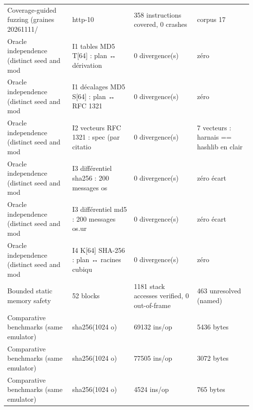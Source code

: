 \begin{table}[htbp]
\begin{tabularx}{\textwidth}{@{}l l X l@{}}
Coverage-guided fuzzing (graines 20261111/ & http-10 & 358 instructions covered, 0 crashes & corpus 17 \\
Oracle independence (distinct seed and mod & I1 tables MD5 T[64] : plan ↔ dérivation  & 0 divergence(s) & zéro \\
Oracle independence (distinct seed and mod & I1 décalages MD5 S[64] : plan ↔ RFC 1321 & 0 divergence(s) & zéro \\
Oracle independence (distinct seed and mod & I2 vecteurs RFC 1321 : spec (par citatio & 0 divergence(s) & 7 vecteurs : harnais == hashlib en clair \\
Oracle independence (distinct seed and mod & I3 différentiel sha256 : 200 messages os & 0 divergence(s) & zéro écart \\
Oracle independence (distinct seed and mod & I3 différentiel md5 : 200 messages os.ur & 0 divergence(s) & zéro écart \\
Oracle independence (distinct seed and mod & I4 K[64] SHA-256 : plan ↔ racines cubiqu & 0 divergence(s) & zéro \\
Bounded static memory safety & 52 blocks & 1181 stack accesses verified, 0 out-of-frame & 463 unresolved (named) \\
Comparative benchmarks (same emulator) & sha256(1024 o) & 69132 ins/op & 5436 bytes \\
Comparative benchmarks (same emulator) & sha256(1024 o) & 77505 ins/op & 3072 bytes \\
Comparative benchmarks (same emulator) & sha256(1024 o) & 4524 ins/op & 765 bytes \\
\bottomrule
\end{tabularx}\end{table}
